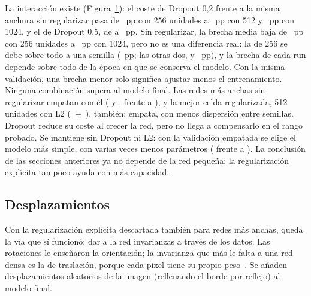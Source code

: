 {La interacción existe (Figura~\ref{fig:capreg}): el coste de Dropout 0,2 frente a la misma anchura sin regularizar
pasa de ~pp con 256 unidades a ~pp con 512 y ~pp con 1024,
y el de Dropout 0,5, de  a ~pp. Sin regularizar, la brecha media baja de
~pp con 256 unidades a ~pp con 1024, pero no es una diferencia real: la de 256 se
debe sobre todo a una semilla (~pp; las otras dos,  y
~pp), y la brecha de cada run depende sobre todo de la época en que se conserva el modelo. Con la
misma validación, una brecha menor solo significa ajustar menos el entrenamiento.}
{Ninguna combinación supera al modelo final. Las redes más anchas sin regularizar empatan con él
( y , frente a ), y la mejor celda regularizada,
512 unidades con L2 (~$\pm$~), también: empata, con menos
dispersión entre semillas. Dropout reduce su coste al crecer la red, pero no llega a compensarlo en el rango
probado.}
{Se mantiene  sin Dropout ni L2: con la validación empatada se elige el modelo más simple, con
varias veces menos parámetros ( frente a ). La conclusión de las
secciones anteriores ya no depende de la red pequeña: la regularización explícita tampoco ayuda con más capacidad.}

\begin{figure}[!htbp]
  \centering
  \caption{}
  \label{fig:capreg}
\end{figure}

\subsection{Desplazamientos}\label{sec:shift}
Con la regularización explícita descartada también para redes más anchas, queda la vía que sí funcionó: dar a la red
invarianzas a través de los datos. Las rotaciones le enseñaron la orientación; la invarianza que más le falta a una red
densa es la de traslación, porque cada píxel tiene su propio peso~\cite{goodfellow}. Se añaden desplazamientos
aleatorios de la imagen (rellenando el borde por reflejo) al modelo final.

